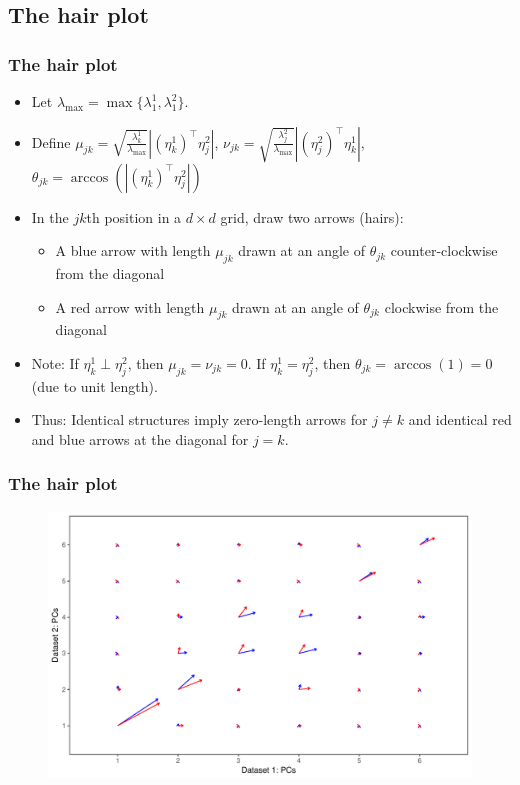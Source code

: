 \documentclass[a4]{beamer}
\begin{document}
\subsection{The hair plot}
\begin{frame}
\frametitle{The hair plot}
   \begin{itemize}
   \item Let $\lambda_\text{max} = \max\{\lambda^1_1, \lambda^2_1\}$. 
   \item Define $\mu_{jk} = \sqrt{\frac{\lambda^1_k}{\lambda_\text{max}}} \left|(\eta^1_k)^\top \eta^2_j \right|$, $\nu_{jk} = \sqrt{\frac{\lambda^2_j}{\lambda_\text{max}}} \left|(\eta^2_j)^\top \eta^1_k \right|$,
   $\theta_{jk} = \arccos \left( \left|(\eta^1_k)^\top \eta^2_j \right| \right)$
   \item In the $jk$th position in a $d \times d$ grid, draw two arrows (hairs): 
   \begin{itemize}
   	\item A blue arrow with length $\mu_{jk}$ drawn at an angle of $\theta_{jk}$ counter-clockwise from the diagonal
   	\item A red arrow with length $\mu_{jk}$ drawn at an angle of $\theta_{jk}$ clockwise from the diagonal
   \end{itemize} 
  \item Note: If $\eta^1_k \perp \eta^2_j$, then $\mu_{jk} = \nu_{jk} =  0$. If $\eta^1_k = \eta^2_j$, then $\theta_{jk} = \arccos(1) = 0$ (due to unit length). 
  \item Thus: Identical structures imply zero-length arrows for $j \neq k$ and identical red and blue arrows at the diagonal for $j = k$.  
   \end{itemize}
\end{frame}

\begin{frame}
\frametitle{The hair plot}
\begin{figure}
\centering
    \includegraphics[scale = 0.4]{essDKBGhair.pdf}
\end{figure}
\end{frame}
\end{document}

